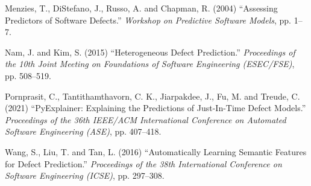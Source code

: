 \documentclass[10pt, a4paper]{article}
\begin{document}
\vspace{0.3em}
\noindent Menzies, T., DiStefano, J., Russo, A. and Chapman, R. (2004) ``Assessing Predictors of Software Defects.'' \textit{Workshop on Predictive Software Models}, pp. 1--7.

\vspace{0.3em}
\noindent Nam, J. and Kim, S. (2015) ``Heterogeneous Defect Prediction.'' \textit{Proceedings of the 10th Joint Meeting on Foundations of Software Engineering (ESEC/FSE)}, pp. 508--519.

\vspace{0.3em}
\noindent Pornprasit, C., Tantithamthavorn, C. K., Jiarpakdee, J., Fu, M. and Treude, C. (2021) ``PyExplainer: Explaining the Predictions of Just-In-Time Defect Models.'' \textit{Proceedings of the 36th IEEE/ACM International Conference on Automated Software Engineering (ASE)}, pp. 407--418.

\vspace{0.3em}
\noindent Wang, S., Liu, T. and Tan, L. (2016) ``Automatically Learning Semantic Features for Defect Prediction.'' \textit{Proceedings of the 38th International Conference on Software Engineering (ICSE)}, pp. 297--308.
\end{document}

